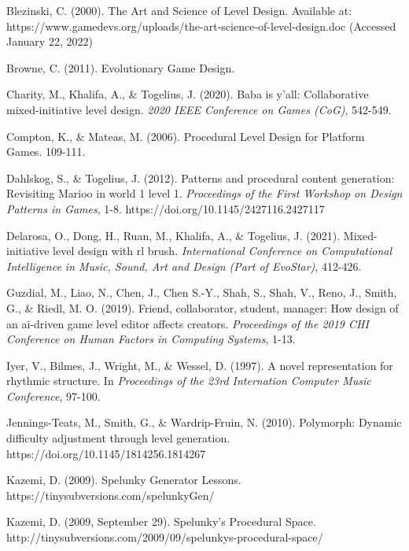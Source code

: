 \begin{thebibliography}{9}

Blezinski, C. (2000). The Art and Science of Level Design. Available at: https://www.gamedevs.org/uploads/the-art-science-of-level-design.doc (Accessed January 22, 2022)

Browne, C. (2011). Evolutionary Game Design.

Charity, M., Khalifa, A., \& Togelius, J. (2020). Baba is y'all: Collaborative mixed-initiative level design. \emph{2020 IEEE Conference on Games (CoG)}, 542-549.

Compton, K., \& Mateas, M. (2006). Procedural Level Design for Platform Games. 109-111.

Dahlskog, S., \& Togelius, J. (2012). Patterns and procedural content generation: Revisiting Marioo in world 1 level 1. \emph{Proceedings of the First Workshop on Design Patterns in Games}, 1-8. https://doi.org/10.1145/2427116.2427117

Delarosa, O., Dong, H., Ruan, M., Khalifa, A., \& Togelius, J. (2021). Mixed-initiative level design with rl brush. \emph{International Conference on Computational Intelligence in Music, Sound, Art and Design (Part of EvoStar)}, 412-426.

Guzdial, M., Liao, N., Chen, J., Chen S.-Y., Shah, S., Shah, V., Reno, J., Smith, G., \& Riedl, M. O. (2019). Friend, collaborator, student, manager: How design of an ai-driven game level editor affects creators. \emph{Proceedings of the 2019 CHI Conference on Human Factors in Computing Systems}, 1-13.

Iyer, V., Bilmes, J., Wright, M., \& Wessel, D. (1997). A novel representation for rhythmic structure. In \emph{Proceedings of the 23rd Internation Computer Music Conference}, 97-100.

Jennings-Teats, M., Smith, G., \& Wardrip-Fruin, N. (2010). Polymorph: Dynamic difficulty adjustment through level generation. https://doi.org/10.1145/1814256.1814267

Kazemi, D. (2009). Spelunky Generator Lessons. https://tinysubversions.com/spelunkyGen/

Kazemi, D. (2009, September 29). Spelunky's Procedural Space. http://tinysubversions.com/2009/09/spelunkys-procedural-space/


\end{thebibliography}
